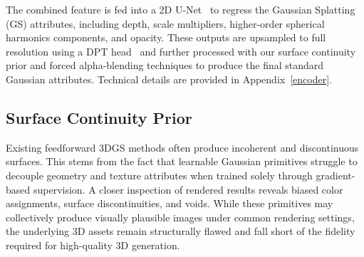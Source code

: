 The combined feature is fed into a 2D U-Net~\cite{ronneberger2015u,rombach2022high} to regress the Gaussian Splatting (GS) attributes, including depth, scale multipliers, higher-order spherical harmonics components, and opacity. These outputs are upsampled to full resolution using a DPT head~\cite{ranftl2021vision} and further processed with our surface continuity prior and forced alpha-blending techniques to produce the final standard Gaussian attributes. Technical details are provided in Appendix~\ref{encoder}.


\subsection{Surface Continuity Prior}


Existing feedforward 3DGS methods often produce incoherent and discontinuous surfaces. This stems from the fact that learnable Gaussian primitives struggle to decouple geometry and texture attributes when trained solely through gradient-based supervision. A closer inspection of rendered results reveals biased color assignments, surface discontinuities, and voids. While these primitives may collectively produce visually plausible images under common rendering settings, the underlying 3D assets remain structurally flawed and fall short of the fidelity required for high-quality 3D generation.

